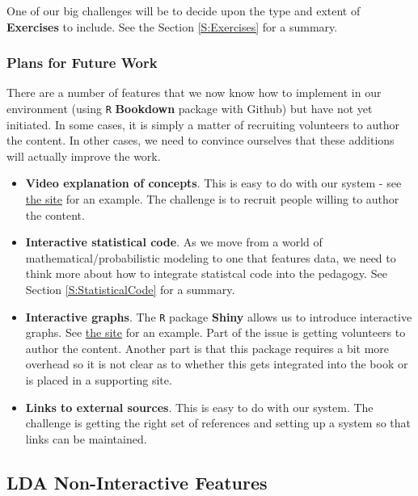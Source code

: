 \documentclass[]{article}
\begin{document}
One of our big challenges will be to decide upon the type and extent of
\textbf{Exercises} to include. See the Section \ref{S:Exercises} for a
summary.

\subsubsection{Plans for Future Work}\label{plans-for-future-work}

There are a number of features that we now know how to implement in our
environment (using \texttt{R} \textbf{Bookdown} package with Github) but
have not yet initiated. In some cases, it is simply a matter of
recruiting volunteers to author the content. In other cases, we need to
convince ourselves that these additions will actually improve the work.

\begin{itemize}
\item
  \textbf{Video explanation of concepts}. This is easy to do with our
  system - see
  \href{https://ewfreesres.github.io/RegressModel/index.html}{the site}
  for an example. The challenge is to recruit people willing to author
  the content.
\item
  \textbf{Interactive statistical code}. As we move from a world of
  mathematical/probabilistic modeling to one that features data, we need
  to think more about how to integrate statistcal code into the
  pedagogy. See Section \ref{S:StatisticalCode} for a summary.
\item
  \textbf{Interactive graphs}. The \texttt{R} package \textbf{Shiny}
  allows us to introduce interactive graphs. See
  \href{https://ewfrees.github.io/LDARcode/index.html\#32_gamma_distribution}{the
  site} for an example. Part of the issue is getting volunteers to
  author the content. Another part is that this package requires a bit
  more overhead so it is not clear as to whether this gets integrated
  into the book or is placed in a supporting site.
\item
  \textbf{Links to external sources}. This is easy to do with our
  system. The challenge is getting the right set of references and
  setting up a system so that links can be maintained.
\end{itemize}

\subsection{LDA Non-Interactive Features}\label{S:NonFeatures}
\end{document}
